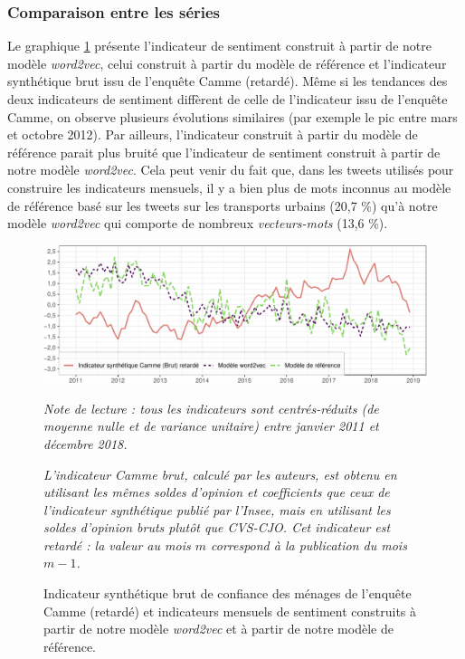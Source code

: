 \documentclass[11pt,french,french]{article}
\begin{document}
\hypertarget{subsec:compseries}{%
\subsubsection{Comparaison entre les séries}\label{subsec:compseries}}

Le graphique \ref{fig:bslogcam} présente l'indicateur de sentiment construit à partir de notre modèle \emph{word2vec}, celui construit à partir du modèle de référence et l'indicateur synthétique brut issu de l'enquête Camme (retardé).
Même si les tendances des deux indicateurs de sentiment diffèrent de celle de l'indicateur issu de l'enquête Camme, on observe plusieurs évolutions similaires (par exemple le pic entre mars et octobre 2012).
Par ailleurs, l'indicateur construit à partir du modèle de référence parait plus bruité que l'indicateur de sentiment construit à partir de notre modèle \emph{word2vec}.
Cela peut venir du fait que, dans les tweets utilisés pour construire les indicateurs mensuels, il y a bien plus de mots inconnus au modèle de référence basé sur les tweets sur les transports urbains (20,7 \%) qu'à notre modèle \emph{word2vec} qui comporte de nombreux \emph{vecteurs-mots} (13,6 \%).

\begin{figure}[htp]
{\centering \includegraphics[width =\textwidth]{img/rmd-graphSentiments-1}}
\captionsetup{margin=0cm,format=hang,justification=justified}
\caption{Indicateur synthétique brut de confiance des ménages de l'enquête Camme (retardé) et indicateurs mensuels de sentiment construits à partir de notre modèle \emph{word2vec} et à partir de notre modèle de référence.}\label{fig:bslogcam}
\footnotesize
\emph{Note de lecture : tous les indicateurs sont centrés-réduits (de moyenne nulle et de variance unitaire) entre janvier 2011 et décembre 2018.}

\emph{L'indicateur Camme brut, calculé par les auteurs, est obtenu en utilisant les mêmes soldes d'opinion et coefficients que ceux de l'indicateur synthétique publié par l'Insee, mais en utilisant les soldes d'opinion bruts plutôt que CVS-CJO.
Cet indicateur est retardé : la valeur au mois $m$ correspond à la publication du mois $m-1$.}
\end{figure}
\end{document}
